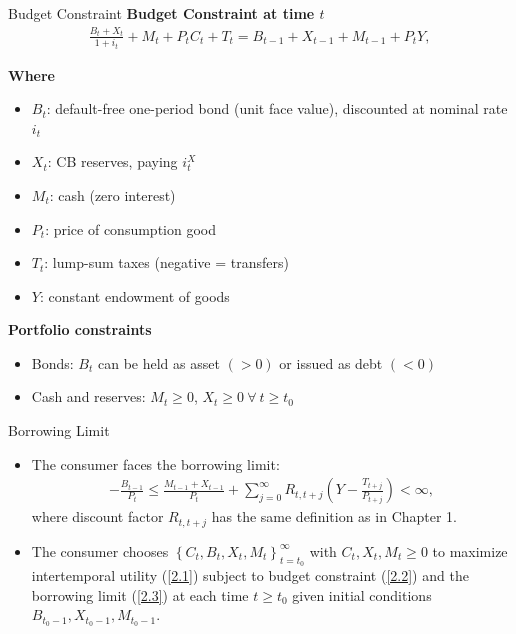 \documentclass[11pt,aspectratio=169]{beamer}
\begin{document}
\begin{frame}[label=orig_budget]{Budget Constraint}
\small
\textbf{Budget Constraint at time $t$}
\begin{align}
\frac{B_t+X_t}{1+i_t}+M_t+P_t C_t + T_t = B_{t-1}+X_{t-1}+M_{t-1}+P_t Y, \label{2.2}
\end{align} 

\textbf{Where}
\begin{itemize}
  \item $B_t$: default-free one-period bond (unit face value), discounted at nominal rate $i_t$
  \item $X_t$: CB reserves, paying $i_t^X$
  \item $M_t$: cash (zero interest)
  \item $P_t$: price of consumption good
  \item $T_t$: lump-sum taxes (negative = transfers)
  \item $Y$: constant endowment of goods
\end{itemize}

\textbf{Portfolio constraints}
\begin{itemize}
  \item Bonds: $B_t$ can be held as asset $(>0)$ or issued as debt $(<0)$
  \item Cash and reserves: $M_t \ge 0$, $X_t \ge 0 \ \forall \ t \ge t_0$
\end{itemize}
\end{frame}

\begin{frame}{Borrowing Limit}
\begin{itemize}
    
\item The consumer faces the borrowing limit:
\begin{align}
-\frac{B_{t-1}}{P_t}\le \frac{M_{t-1}+X_{t-1}}{P_t}+\sum_{j=0}^\infty R_{t,t+j}\left(Y-\frac{T_{t+j}}{P_{t+j}}\right) < \infty, \label{2.3}
\end{align}
where discount factor $R_{t,t+j}$ has the same definition as in Chapter 1. \\ \vspace{1em}

\item The consumer chooses $\left\{  C_t, B_t, X_t, M_t \right\}_{t=t_0}^{\infty}$ with $C_t, X_t, M_t \ge 0$ to maximize intertemporal utility (\ref{2.1}) subject to budget constraint (\ref{2.2}) and the borrowing limit (\ref{2.3}) at each time $t\ge t_0$ given initial conditions $B_{t_0-1}, X_{t_0-1}, M_{t_0-1}$.

\end{itemize}
\end{frame}
\end{document}
